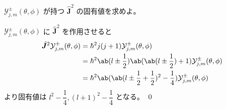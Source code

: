\documentclass[uplatex,dvipdfmx,a4paper,11pt]{jlreq}
\makeatletter
\theoremstyle{definition}
\renewenvironment{proof}[1][\proofname]{\par
  \normalfont
  \topsep6\p@\@plus6\p@ \trivlist
  \item[\hskip\labelsep{\bfseries #1}\@addpunct{\bfseries}]\ignorespaces\quad\par
}{%
  \qed\endtrivlist\@endpefalse
}
\renewcommand\proofname{証明}
\numberwithin{equation}{section}
\makeatother
\begin{document}
\begin{problem}
$\mathcal{Y}_{j, m}^\pm(\theta, \phi)$ が持つ $\hat{\bm{J}}^2$ の固有値を求めよ。
\end{problem}
\begin{proof}
  $\mathcal{Y}_{j, m}^\pm(\theta, \phi)$ に $\hat{\bm{J}}^2$ を作用させると
  \begin{align}
    \hat{\bm{J}}^2\mathcal{Y}_{j, m}^\pm(\theta, \phi) & = \hbar^2j(j+1) \mathcal{Y}_{j, m}^\pm(\theta, \phi)                                                   \\
                                                       & = \hbar^2\ab(l \pm \frac{1}{2})\ab(\ab(l \pm \frac{1}{2}) + 1)\mathcal{Y}_{j, m}^\pm(\theta, \phi)     \\
                                                       & = \hbar^2\ab(\ab(l \pm \frac{1}{2} + \frac{1}{2})^2 - \frac{1}{4})\mathcal{Y}_{j, m}^\pm(\theta, \phi)
  \end{align}
  より固有値は $l^2 - \dfrac{1}{4}, (l + 1)^2 - \dfrac{1}{4}$ となる。
\end{proof}
\end{document}
